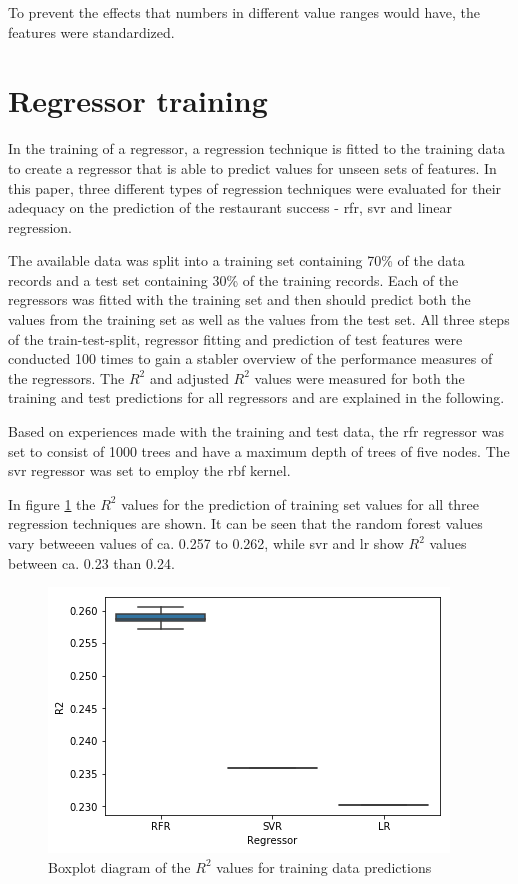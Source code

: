 \documentclass[a4paper, 11pt, oneside]{Thesis}  %
\begin{document}
To prevent the effects that numbers in different value ranges would have, the features were standardized.

\section{Regressor training}

In the training of a regressor, a regression technique is fitted to the training data to create a regressor that is able to predict values for unseen sets of features. In this paper, three different types of regression techniques were evaluated for their adequacy on the prediction of the restaurant success - \ac{rfr}, \ac{svr} and linear regression.

The available data was split into a training set containing 70\% of the data records and a test set containing 30\% of the training records. Each of the regressors was fitted with the training set and then should predict both the values from the training set as well as the values from the test set. All three steps of the train-test-split, regressor fitting and prediction of test features were conducted 100 times to gain a stabler overview of the performance measures of the regressors. The $R^2$ and adjusted $R^2$ values were measured for both the training and test predictions for all regressors and are explained in the following.

Based on experiences made with the training and test data, the \ac{rfr} regressor was set to consist of 1000 trees and have a maximum depth of trees of five nodes. The \ac{svr} regressor was set to employ the \ac{rbf} kernel.

In figure \ref{fig:boxplot_r2_training_data} the $R^2$ values for the prediction of training set values for all three regression techniques are shown. It can be seen that the random forest values vary betweeen values of ca. 0.257 to 0.262, while \ac{svr} and \ac{lr} show $R^2$ values between ca. 0.23 than 0.24.

\begin{figure}[h]
\includegraphics[scale=0.7]{Figures/Regressor_comparison/boxplot_r2_training_data.png}
\centering
\caption{Boxplot diagram of the $R^2$ values for training data predictions}
\label{fig:boxplot_r2_training_data}
\end{figure}
\end{document}
